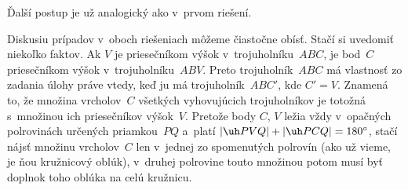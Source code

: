 {Ďalší postup je už analogický ako v~prvom riešení.

\smallskip
Diskusiu prípadov v~oboch riešeniach môžeme čiastočne obísť.
Stačí si uvedomiť niekoľko faktov. Ak $V$ je priesečníkom výšok
v~trojuholníku~$ABC$, je bod~$C$ priesečníkom výšok v~trojuholníku~$ABV$.
Preto trojuholník~$ABC$ má vlastnosť zo zadania úlohy
práve vtedy, keď ju má trojuholník~$ABC'$, kde $C'=V$. Znamená to, že
množina vrcholov~$C$ všetkých vyhovujúcich trojuholníkov je totožná
s~množinou ich priesečníkov výšok~$V$. Pretože body $C$, $V$
ležia vždy v~opačných polrovinách určených priamkou~$PQ$ a~platí
$|\uh PVQ| + |\uh PCQ| = 180^\circ $, stačí nájsť množinu
vrcholov~$C$ len v~jednej zo spomenutých polrovín (ako už vieme, je
ňou kružnicový oblúk), v~druhej polrovine touto množinou potom musí
byť doplnok toho oblúka na celú kružnicu.}


